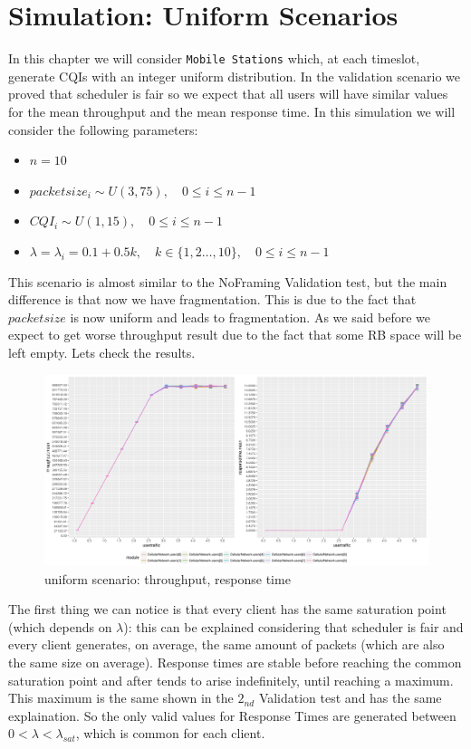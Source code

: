 \chapter{Simulation: Uniform Scenarios}
In this chapter we will consider \texttt{Mobile Stations} which, at each timeslot, generate CQIs with an integer uniform distribution. In the validation scenario we proved that scheduler is fair so we expect that all users will have similar values for the mean throughput and the mean response time. In this simulation we will consider the following parameters:
\begin{itemize}
	\item \(n=10\)
	\item \(packetsize_{i} \sim U(3,75), \quad 0 \le i \le n-1\)
	\item \(CQI_{i} \sim U(1,15), \quad 0 \le i \le n-1\)
	\item \( \lambda = \lambda_{i} = 0.1 + 0.5k, \quad k\in\{1,2\ldots,10\}, \quad 0 \le i \le n-1\)
\end{itemize}
This scenario is almost similar to the NoFraming Validation test, but the main difference is that now we have fragmentation. This is due to the fact that \(packetsize\) is now uniform and leads to fragmentation. As we said before we expect to get worse throughput result due to the fact that some RB space will be left empty. Lets check the results.

\begin{figure}[H]
  \includegraphics[width=1\textwidth]{images/unif}
  \caption{uniform scenario: throughput, response time}
  \label{fig:uniform scenario: throughput, response time}
\end{figure}
The first thing we can notice is that every client has the same saturation point (which depends on \(\lambda\)): this can be explained considering that scheduler is fair and every client generates, on average, the same amount of packets (which are also the same size on average). Response times are stable before reaching the common saturation point and after tends to arise indefinitely, until reaching a maximum. This maximum is the same shown in the \(2_{nd}\) Validation test and has the same explaination. So the only valid values for Response Times are generated between \(0 < \lambda < \lambda_{sat}\), which is common for each client.


